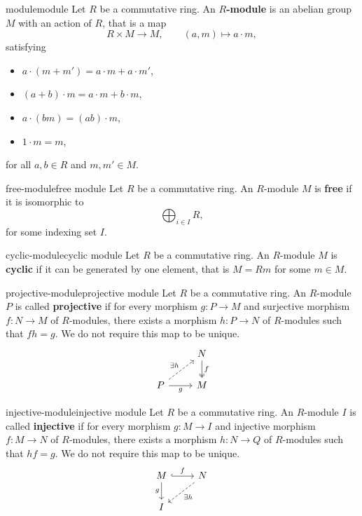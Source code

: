 \begin{topic}{module}{module}
    Let $R$ be a commutative ring. An \textbf{$R$-module} is an abelian group $M$ with an action of $R$, that is a map
    \[ R \times M \to M, \qquad (a, m) \mapsto a \cdot m, \]
    satisfying
    \begin{itemize}
        \item $a \cdot (m + m') = a \cdot m + a \cdot m'$,
        \item $(a + b) \cdot m = a \cdot m + b \cdot m$,
        \item $a \cdot (bm) = (ab) \cdot m$,
        \item $1 \cdot m = m$,
    \end{itemize}
    for all $a, b \in R$ and $m, m' \in M$.
\end{topic}

\begin{topic}{free-module}{free module}
    Let $R$ be a commutative ring. An $R$-module $M$ is \textbf{free} if it is isomorphic to
    \[ \bigoplus_{i \in I} R , \]
    for some indexing set $I$.
\end{topic}

\begin{topic}{cyclic-module}{cyclic module}
    Let $R$ be a commutative ring. An $R$-module $M$ is \textbf{cyclic} if it can be generated by one element, that is $M = Rm$ for some $m \in M$.
\end{topic}

\begin{topic}{projective-module}{projective module}
    Let $R$ be a commutative ring. An $R$-module $P$ is called \textbf{projective} if for every morphism $g : P \to M$ and surjective morphism $f : N \to M$ of $R$-modules, there exists a morphism $h : P \to N$ of $R$-modules such that $fh = g$. We do not require this map to be unique.
    \[ \begin{tikzcd} & N \arrow[twoheadrightarrow]{d}{f} \\ P \arrow[swap]{r}{g} \arrow[dashed]{ur}{\exists h} & M \end{tikzcd} \]
\end{topic}

\begin{topic}{injective-module}{injective module}
    Let $R$ be a commutative ring. An $R$-module $I$ is called \textbf{injective} if for every morphism $g : M \to I$ and injective morphism $f : M \to N$ of $R$-modules, there exists a morphism $h : N \to Q$ of $R$-modules such that $hf = g$. We do not require this map to be unique.
    \[ \begin{tikzcd} M \arrow[hookrightarrow]{r}{f} \arrow[swap]{d}{g} & N \arrow[dashed]{ld}{\exists h} \\ I & \end{tikzcd} \]
\end{topic}

